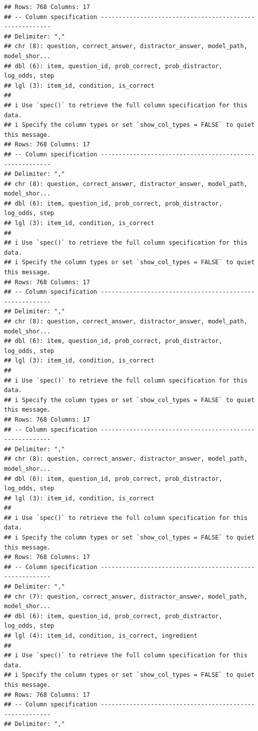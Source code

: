 \documentclass[
]{article}
\begin{document}
\begin{verbatim}
## Rows: 768 Columns: 17
## -- Column specification --------------------------------------------------------
## Delimiter: ","
## chr (8): question, correct_answer, distractor_answer, model_path, model_shor...
## dbl (6): item, question_id, prob_correct, prob_distractor, log_odds, step
## lgl (3): item_id, condition, is_correct
## 
## i Use `spec()` to retrieve the full column specification for this data.
## i Specify the column types or set `show_col_types = FALSE` to quiet this message.
## Rows: 768 Columns: 17
## -- Column specification --------------------------------------------------------
## Delimiter: ","
## chr (8): question, correct_answer, distractor_answer, model_path, model_shor...
## dbl (6): item, question_id, prob_correct, prob_distractor, log_odds, step
## lgl (3): item_id, condition, is_correct
## 
## i Use `spec()` to retrieve the full column specification for this data.
## i Specify the column types or set `show_col_types = FALSE` to quiet this message.
## Rows: 768 Columns: 17
## -- Column specification --------------------------------------------------------
## Delimiter: ","
## chr (8): question, correct_answer, distractor_answer, model_path, model_shor...
## dbl (6): item, question_id, prob_correct, prob_distractor, log_odds, step
## lgl (3): item_id, condition, is_correct
## 
## i Use `spec()` to retrieve the full column specification for this data.
## i Specify the column types or set `show_col_types = FALSE` to quiet this message.
## Rows: 768 Columns: 17
## -- Column specification --------------------------------------------------------
## Delimiter: ","
## chr (8): question, correct_answer, distractor_answer, model_path, model_shor...
## dbl (6): item, question_id, prob_correct, prob_distractor, log_odds, step
## lgl (3): item_id, condition, is_correct
## 
## i Use `spec()` to retrieve the full column specification for this data.
## i Specify the column types or set `show_col_types = FALSE` to quiet this message.
## Rows: 768 Columns: 17
## -- Column specification --------------------------------------------------------
## Delimiter: ","
## chr (7): question, correct_answer, distractor_answer, model_path, model_shor...
## dbl (6): item, question_id, prob_correct, prob_distractor, log_odds, step
## lgl (4): item_id, condition, is_correct, ingredient
## 
## i Use `spec()` to retrieve the full column specification for this data.
## i Specify the column types or set `show_col_types = FALSE` to quiet this message.
## Rows: 768 Columns: 17
## -- Column specification --------------------------------------------------------
## Delimiter: ","

\end{verbatim}
\end{document}
